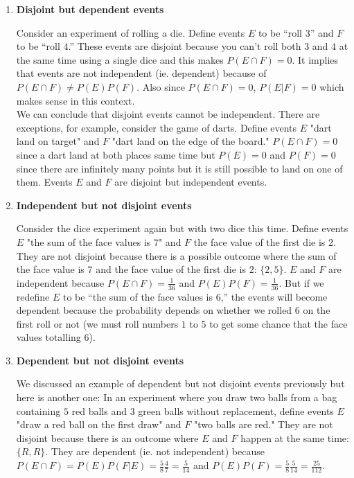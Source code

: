 \begin{enumerate}
	\item \textbf{Disjoint but dependent events}
	
	Consider an experiment of rolling a die. Define events $E$ to be ``roll $3$'' and $F$ to be ``roll $4$.'' These events are disjoint because you can't roll both $3$ and $4$ at the same time using a single dice and this makes $P(E \cap F)=0$. It implies that events are not independent (ie. dependent) because of $P(E \cap F) \ne P(E)P(F)$. Also since $P(E \cap F)=0$, $P(E|F)=0$ which makes sense in this context. \\ 
	
	We can conclude that disjoint events cannot be independent. There are exceptions, for example, consider the game of darts. Define events $E$ "dart land on target" and $F$ "dart land on the edge of the board." $P(E\cap F)=0$ since a dart land at both places same time but $P(E)=0$ and $P(F)=0$ since there are infinitely many points but it is still possible to land on one of them. Events $E$ and $F$ are disjoint but independent events.
	\item \textbf{Independent but not disjoint events}
	
	Consider the dice experiment again but with two dice this time. Define events $E$ "the sum of the face values is $7$" and $F$ the face value of the first die is $2$. They are not disjoint because there is a possible outcome where the sum of the face value is $7$ and the face value of the first die is $2$: $\{2, 5\}$. $E$ and $F$ are independent because $P(E\cap F)=\frac{1}{36}$ and $P(E)P(F)=\frac{1}{36}$. But if we redefine $E$ to be ``the sum of the face values is $6$,'' the events will become dependent because the probability depends on whether we rolled $6$ on the first roll or not (we must roll numbers $1$ to $5$ to get some chance that the face values totalling $6$).
	\item \textbf{Dependent but not disjoint events}
	
	We discussed an example of dependent but not disjoint events previously but here is another one: In an experiment where you draw two balls from a bag containing $5$ red balls and $3$ green balls without replacement, define events $E$ "draw a red ball on the first draw" and $F$ "two balls are red." They are not disjoint because there is an outcome where $E$ and $F$ happen at the same time: $\{R, R\}$. They are dependent (ie. not independent) because $P(E\cap F)=P(E)P(F|E)=\frac58 \frac47=\frac{5}{14}$ and $P(E)P(F)=\frac58 \frac{5}{14}=\frac{25}{112}$.
\end{enumerate}

